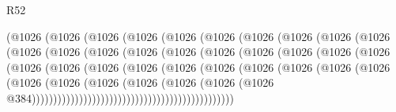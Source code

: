 \begin{lexlean}{R52}
\begin{coremodule}
                        (@1026
                          (@1026
                            (@1026
                              (@1026
                                (@1026
                                  (@1026
                                    (@1026
                                      (@1026
                                        (@1026
                                          (@1026
                                            (@1026
                                              (@1026
                                                (@1026
                                                  (@1026
                                                    (@1026
                                                      (@1026
                                                        (@1026
                                                          (@1026
                                                            (@1026
                                                              (@1026
                                                                (@1026
                                                                  (@1026
                                                                    (@1026
                                                                      (@1026
                                                                        (@1026
                                                                          (@1026
                                                                            (@1026
                                                                              (@1026
                                                                                (@1026
                                                                                  (@1026
                                                                                    (@1026
                                                                                      (@1026
                                                                                        (@1026
                                                                                          (@1026
                                                                                            (@1026
                                                                                              (@1026
                                                                                                (@1026
                                                                                                  @384)))))))))))))))))))))))))))))))))))))))))))))))

\end{coremodule}
\end{lexlean}
